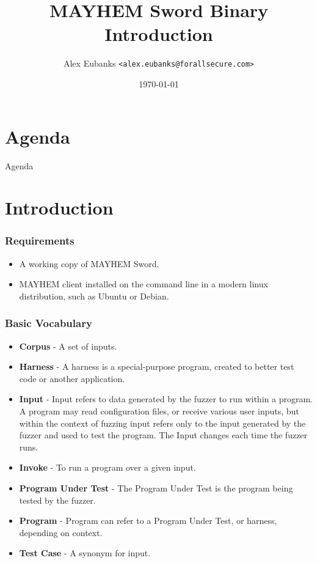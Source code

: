 \documentclass{beamer}
\title{MAYHEM Sword Binary Introduction}
\date{\today}
\author[Eubanks]{Alex Eubanks \texttt{<alex.eubanks@forallsecure.com>}}
\begin{document}
\begin{frame}
\titlepage
\end{frame}

\section{Agenda}

\begin{frame}{Agenda}
\setlength{\parskip}{0cm}
\tableofcontents
\end{frame}

\section{Introduction}

\begin{frame}
\frametitle{Requirements}
\begin{itemize}
  \item A working copy of MAYHEM Sword.
  \item MAYHEM client installed on the command line in a modern linux distribution, such as Ubuntu or Debian.
\end{itemize}
\end{frame}

\begin{frame}
\frametitle{Basic Vocabulary}
\begin{itemize}
  \item \textbf{Corpus} - A set of inputs.
  \item \textbf{Harness} - A harness is a special-purpose program, created to better test code or another application.
  \item \textbf{Input} - Input refers to data generated by the fuzzer to run within a program. A program may read configuration files, or receive various user inputs, but within the context of fuzzing input refers only to the input generated by the fuzzer and used to test the program. The Input changes each time the fuzzer runs.
  \item \textbf{Invoke} - To run a program over a given input.
  \item \textbf{Program Under Test} - The Program Under Test is the program being tested by the fuzzer.
  \item \textbf{Program} - Program can refer to a Program Under Test, or harness, depending on context.
  \item \textbf{Test Case} - A synonym for input.
\end{itemize}
\end{frame}
\end{document}
